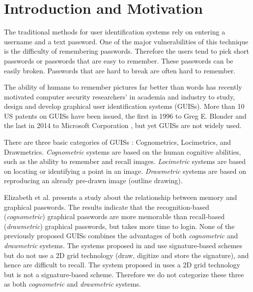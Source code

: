 \documentclass[conference]{IEEEtran}
\begin{document}
\IEEEpeerreviewmaketitle



\section{Introduction and Motivation}\label{sec:introduction}

The traditional methods for user identification systems rely on entering a username and a text password. One of the major vulnerabilities of this technique is the difficulty of remembering passwords. Therefore the users tend to pick short passwords or passwords that are easy to remember. These passwords can be easily broken. Passwords that are hard to break are often hard to remember.

The ability of humans to remember pictures far better than words \cite{picture-memory-1,picture-memory-2} has recently motivated computer security researchers' in academia \cite{gp-survey-acm,gp-survey-ieee,user-authentication-categories,signature-gp,DAS,BDAS,YAGP,web-gp-doodle,pass-go,pass-points,java-gp} and industry \cite{grid-sure,android-pattern-screen-lock,blackberry-pattern-lock,passfaces,commercial-pass-points,windows8-picture-password} to study, design and develop graphical user identification systems (GUISs). More than 10 US patents on GUISs have been issued, the first in 1996 to Greg E. Blonder \cite{gp-blonder} and the last in 2014 to Microsoft Corporation \cite{gp-microsoft-2}, but yet GUISs are not widely used.

There are three basic categories of GUISs \cite{user-authentication-categories}: Cognometrics, Locimetrics, and Drawmetrics. \emph{Cognometric} systems are based on the human cognitive abilities, such as the ability to remember and recall images. \emph{Locimetric} systems are based on locating or identifying a point in an image. \emph{Drawmetric} systems are based on reproducing an already pre-drawn image (outline drawing).

Elizabeth et al. \cite{memory-gp} presents a study about the relationship between memory and graphical passwords. The results indicate that the recognition-based (\emph{cognometric}) graphical passwords are more memorable than recall-based (\emph{drawmetric}) graphical passwords, but takes more time to login. None of the previously proposed GUISs \cite{user-authentication-categories,signature-gp,DAS,BDAS,YAGP,web-gp-doodle,pass-go,pass-points,java-gp,grid-sure,android-pattern-screen-lock,blackberry-pattern-lock,passfaces,commercial-pass-points,windows8-picture-password} combines the advantages of both \emph{cognometric} and \emph{drawmetric} systems. The systems proposed in \cite{signature-gp} and \cite{java-gp} use signature-based schemes but do not use a 2D grid technology (draw, digitize and store the signature), and hence are difficult to recall. The system proposed in \cite{DAS} uses a 2D grid technology but is not a signature-based scheme. Therefore we do not categorize these three \cite{signature-gp,DAS,java-gp} as both \emph{cognometric} and \emph{drawmetric} systems.
\end{document}
